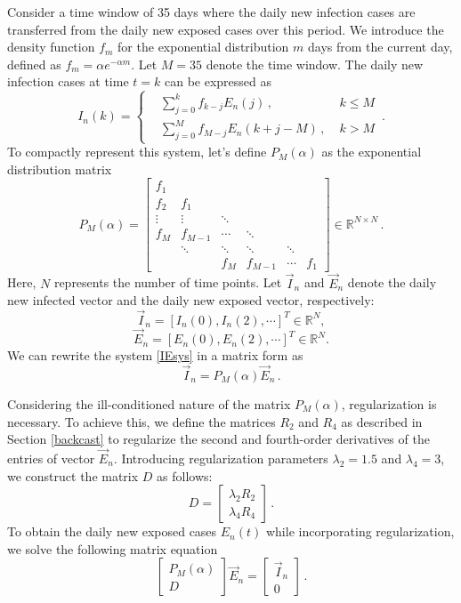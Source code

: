 \documentclass[sn-mathphys,Numbered]{sn-jnl}
\begin{document}
Consider a time window of 35 days where the daily new infection cases are transferred from the daily new exposed cases over this period. We introduce the density function $f_m$ for the exponential distribution $m$ days from the current day, defined as $f_m = \alpha e^{-\alpha m}$. Let $M = 35$ denote the time window.
The daily new infection cases at time $t = k$ can be expressed as
\begin{equation}\label{IEsys}
I_n(k)=\left\{\begin{aligned}
    & \sum_{j=0}^{k} f_{k-j}E_n(j)\,, & \;k\leq M\\
    & \sum_{j=0}^{M} f_{M-j}E_n(k+j-M)\,, & \;k> M
\end{aligned}\right.\,.\end{equation}
To compactly represent this system, let's define $P_{M}(\alpha)$ as the exponential distribution matrix
$$P_{M}(\alpha)=\begin{bmatrix}
f_1    &        &        &        &    \\
f_2    & f_1    &        &        &     \\
\vdots & \vdots &  \ddots&        &     \\
f_M    & f_{M-1}& \cdots & \ddots &    \\
       & \ddots & \ddots & \ddots & \ddots&     \\
       &        & f_M    & f_{M-1}&\cdots& f_1
\end{bmatrix}\in\mathbb{R}^{N\times N}\,.$$
Here, $N$ represents the number of time points. Let $\vec{I}_n$ and $\vec{E}_n$ denote the daily new infected vector and the daily new exposed vector, respectively: 
$$\vec{I}_n = [I_n(0), I_n(2), \cdots]^T\in\mathbb{R}^{N},$$
$$\vec{E}_n = [E_n(0), E_n(2), \cdots]^T\in\mathbb{R}^{N}.$$
We can rewrite the system \eqref{IEsys} in a matrix form as 
$$\vec{I}_n=P_{M}(\alpha)\vec{E}_n\,.$$

Considering the ill-conditioned nature of the matrix $P_M(\alpha)$, regularization is necessary. To achieve this, we define the matrices $R_2$ and $R_4$ as described in Section \ref{backcast} to regularize the second and fourth-order derivatives of the entries of vector $\vec{E}_n$. Introducing regularization parameters $\lambda_2 = 1.5$ and $\lambda_4 = 3$, we construct the matrix $D$ as follows:
$$D=\begin{bmatrix}\lambda_2 R_2\\ \lambda_4 R_4\end{bmatrix}\,.$$
To obtain the daily new exposed cases $E_n(t)$ while incorporating regularization, we solve the following matrix equation
$$\begin{bmatrix}
    P_{M}(\alpha) \\ D
\end{bmatrix}\vec{E}_n = \begin{bmatrix}
    \vec{I}_n \\ 0
\end{bmatrix}\,.$$
\end{document}
